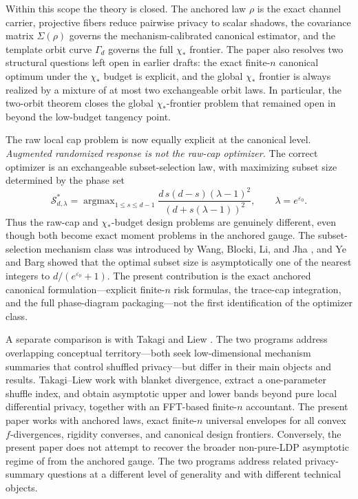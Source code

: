 \documentclass[11pt]{amsart}
\theoremstyle{definition}
\DeclareMathOperator{\argmax}{argmax}
\newcommand{\cS}{\mathcal S}
\begin{document}
Within this scope the theory is closed. The anchored law $\rho$ is the exact channel carrier, projective fibers reduce pairwise privacy to scalar shadows, the covariance matrix $\Sigma(\rho)$ governs the mechanism-calibrated canonical estimator, and the template orbit curve $\Gamma_d$ governs the full $\chi_*$ frontier. The paper also resolves two structural questions left open in earlier drafts: the exact finite-$n$ canonical optimum under the $\chi_*$ budget is explicit, and the global $\chi_*$ frontier is always realized by a mixture of at most two exchangeable orbit laws. In particular, the two-orbit theorem closes the global $\chi_*$-frontier problem that remained open in \cite{shvets-growing} beyond the low-budget tangency point.

The raw local cap problem is now equally explicit at the canonical level. \emph{Augmented randomized response is not the raw-cap optimizer.} The correct optimizer is an exchangeable subset-selection law, with maximizing subset size determined by the phase set
\[
\cS_{d,\lambda}^*=\argmax_{1\le s\le d-1}\frac{d\,s(d-s)(\lambda-1)^2}{(d+s(\lambda-1))^2},
\qquad \lambda=e^{\varepsilon_0}.
\]
Thus the raw-cap and $\chi_*$-budget design problems are genuinely different, even though both become exact moment problems in the anchored gauge. The subset-selection mechanism class was introduced by Wang, Blocki, Li, and Jha \cite{wang-ldp}, and Ye and Barg \cite{ye-barg} showed that the optimal subset size is asymptotically one of the nearest integers to $d/(e^{\varepsilon_0}+1)$. The present contribution is the exact anchored canonical formulation---explicit finite-$n$ risk formulas, the trace-cap integration, and the full phase-diagram packaging---not the first identification of the optimizer class.

A separate comparison is with Takagi and Liew \cite{takagi-liew}. The two programs address overlapping conceptual territory---both seek low-dimensional mechanism summaries that control shuffled privacy---but differ in their main objects and results. Takagi--Liew work with blanket divergence, extract a one-parameter shuffle index, and obtain asymptotic upper and lower bands beyond pure local differential privacy, together with an FFT-based finite-$n$ accountant. The present paper works with anchored laws, exact finite-$n$ universal envelopes for all convex $f$-divergences, rigidity converses, and canonical design frontiers. Conversely, the present paper does not attempt to recover the broader non-pure-LDP asymptotic regime of \cite{takagi-liew} from the anchored gauge. The two programs address related privacy-summary questions at a different level of generality and with different technical objects.
\end{document}
